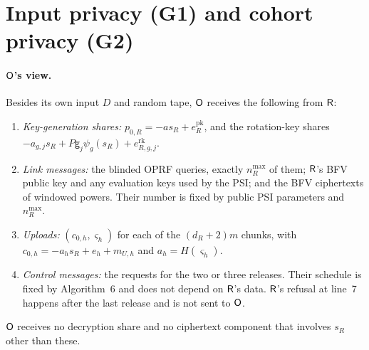 \section{Input privacy (G1) and cohort privacy (G2)}
\label{sec:in}

\paragraph{$\mathsf{O}$'s view.}
Besides its own input $D$ and random tape, $\mathsf{O}$ receives the following from $\mathsf{R}$:
\begin{enumerate}[nosep,label=(\roman*)]
  \item \emph{Key-generation shares:} $p_{0,R}=-as_R+e^{\mathrm{pk}}_R$, and the rotation-key shares $-a_{g,j}s_R+P\mathsf g_j\psi_g(s_R)+e^{\mathrm{rk}}_{R,g,j}$.
  \item \emph{Link messages:} the blinded OPRF queries, exactly $n_R^{\max}$ of them; $\mathsf{R}$'s BFV public key and any evaluation keys used by the PSI; and the BFV ciphertexts of windowed powers. Their number is fixed by public PSI parameters and $n_R^{\max}$.
  \item \emph{Uploads:} $(c_{0,h},\varsigma_h)$ for each of the $(d_R+2)m$ chunks, with $c_{0,h}=-a_hs_R+e_h+m_{U,h}$ and $a_h=H(\varsigma_h)$.
  \item \emph{Control messages:} the requests for the two or three releases. Their schedule is fixed by Algorithm~6 and does not depend on $\mathsf{R}$'s data. $\mathsf{R}$'s refusal at line~7 happens after the last release and is not sent to $\mathsf{O}$.
\end{enumerate}
$\mathsf{O}$ receives no decryption share and no ciphertext component that involves $s_R$ other than these.

